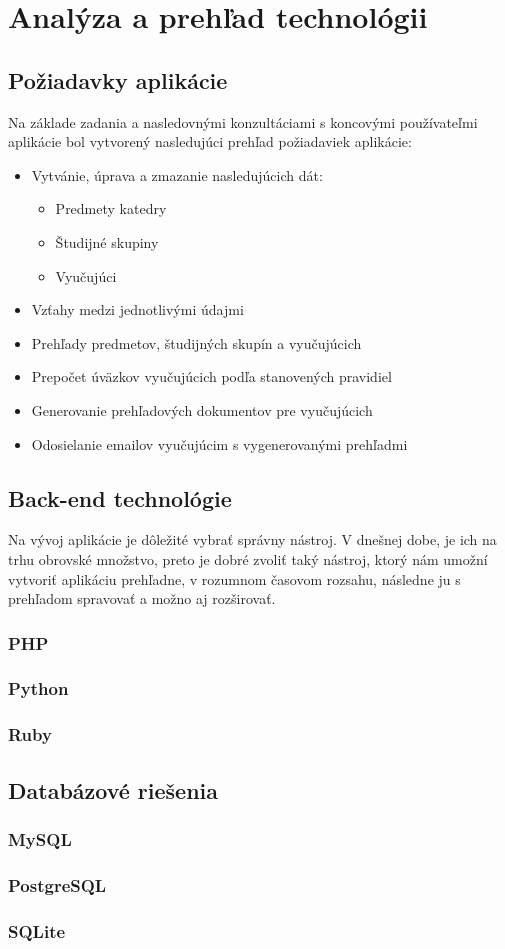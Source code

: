 \chapter{Analýza a prehľad technológii}

\section{Požiadavky aplikácie}

Na základe zadania a nasledovnými konzultáciami s koncovými používateľmi aplikácie bol vytvorený nasledujúci prehľad požiadaviek aplikácie:

\begin{itemize}
    \item Vytvánie, úprava a zmazanie nasledujúcich dát:
        \begin{itemize}
            \item Predmety katedry
            \item Študijné skupiny
            \item Vyučujúci
        \end{itemize}
    \item Vzťahy medzi jednotlivými údajmi
    \item Prehľady predmetov, študijných skupín a vyučujúcich
    \item Prepočet úväzkov vyučujúcich podľa stanovených pravidiel
    \item Generovanie prehľadových dokumentov pre vyučujúcich
    \item Odosielanie emailov vyučujúcim s vygenerovanými prehľadmi
\end{itemize}

\section{Back-end technológie}

Na vývoj aplikácie je dôležité vybrať správny nástroj. V dnešnej dobe, je ich na trhu obrovské množstvo, preto je dobré zvoliť taký nástroj, ktorý nám umožní vytvoriť aplikáciu prehľadne, v rozumnom časovom rozsahu, následne ju s prehľadom spravovať a možno aj rozširovať.

\subsection*{PHP}
\subsection*{Python}
\subsection*{Ruby}

\section{Databázové riešenia}

\subsection*{MySQL}
\subsection*{PostgreSQL}
\subsection*{SQLite}